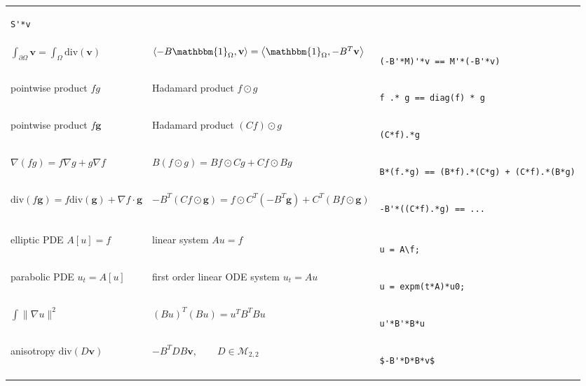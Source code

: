 \documentclass{article}
\begin{document}
\begin{tabular}{l|l|b{}}
\begin{verbatim}
S'*v
\end{verbatim}
\\
$\int_{\partial\Omega}\mathbf{v}=\int_\Omega\mathrm{div}(\mathbf{v})$ &
$\left\langle -B\mathbbm{1}_{\Omega},\mathbf{v}\right\rangle=\left\langle\mathbbm{1}_\Omega,-B^T\mathbf{v}\right\rangle$ &
\begin{verbatim}
(-B'*M)'*v == M'*(-B'*v)
\end{verbatim}
\\
pointwise product $fg$ & Hadamard product $f\odot g$ &
\begin{verbatim}
f .* g == diag(f) * g
\end{verbatim}
\\
pointwise product $f\mathbf{g}$ & Hadamard product $(Cf)\odot g$ &
\begin{verbatim}
(C*f).*g
\end{verbatim}
\\
$\nabla(fg)=f\nabla g+g\nabla f$ &
$B(f\odot g)= Bf\odot Cg+Cf\odot Bg$ &
\begin{verbatim}
B*(f.*g) == (B*f).*(C*g) + (C*f).*(B*g)
\end{verbatim}
\\
$\mathrm{div}(f\mathbf{g})=f\mathrm{div}(\mathbf{g})+\nabla f\cdot\mathbf{g}$ &
$-B^T(Cf\odot\mathbf{g})= f\odot C^T(-B^T\mathbf{g})+C^T\left(Bf\odot\mathbf{g}\right)$ &
\begin{verbatim}
-B'*((C*f).*g) == ...
\end{verbatim}
\\
&&\\
elliptic PDE $A[u]=f$ &
linear system $Au=f$ &
\begin{verbatim}
u = A\f;
\end{verbatim}
\\
parabolic PDE $u_t=A[u]$ &
first order linear ODE system $u_t=Au$ &
\begin{verbatim}
u = expm(t*A)*u0;
\end{verbatim}
\\
$\int\|\nabla u\|^2$ &
$(Bu)^T(Bu)=u^TB^TBu$ &
\begin{verbatim}
u'*B'*B*u
\end{verbatim}
\\
anisotropy $\mathrm{div}(D\mathbf{v})$ &
$-B^TDB\mathbf{v},\qquad D\in\mathcal{M}_{2,2}$ &
\begin{verbatim}
$-B'*D*B*v$
\end{verbatim}
\\
\end{tabular}
\end{document}
